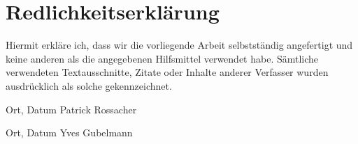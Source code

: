 \newpage
\section*{Redlichkeitserklärung}

Hiermit erkläre ich, dass wir die vorliegende Arbeit selbstständig angefertigt und keine anderen als die angegebenen Hilfsmittel verwendet habe. Sämtliche verwendeten Textausschnitte, Zitate oder Inhalte anderer Verfasser wurden ausdrücklich als solche gekennzeichnet. 
\vspace{2cm}

\textemdash\textemdash\textemdash\textemdash\textemdash\textemdash
\textemdash\textemdash\textemdash\textemdash\textemdash\textemdash
\hspace{2.2cm}
\textemdash\textemdash\textemdash\textemdash\textemdash\textemdash
\textemdash\textemdash\textemdash\textemdash\textemdash\textemdash
\textemdash\textemdash\textemdash\textemdash\textemdash\textemdash
\newline
Ort, Datum 
\hspace{5cm} 
Patrick Rossacher

\vspace{2cm}

\textemdash\textemdash\textemdash\textemdash\textemdash\textemdash
\textemdash\textemdash\textemdash\textemdash\textemdash\textemdash
\hspace{2.2cm}
\textemdash\textemdash\textemdash\textemdash\textemdash\textemdash
\textemdash\textemdash\textemdash\textemdash\textemdash\textemdash
\textemdash\textemdash\textemdash\textemdash\textemdash\textemdash
\newline
Ort, Datum 
\hspace{5cm} 
Yves Gubelmann


